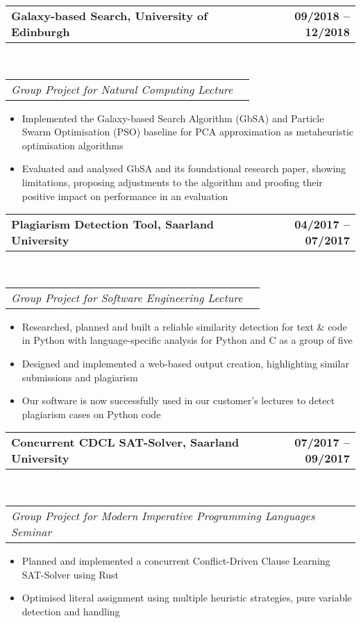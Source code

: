 \documentclass[10pt,letterpaper]{article}
\makeatletter
\newcommand{\headerrow}[2]
{\begin{tabular*}{\linewidth}{l@{\extracolsep{\fill}}r}
	#1 &
	#2 \\
\end{tabular*}}
\makeatother
\begin{document}
\vspace{0.4em}

\noindent
\headerrow{\textbf{Galaxy-based Search, University of Edinburgh}}{\textbf{09/2018 -- 12/2018}}
\\
\headerrow{\emph{Group Project for Natural Computing Lecture}}{}
\vspace{-1.6em}
\begin{itemize}
    \setlength\itemsep{0em}
    \item Implemented the Galaxy-based Search Algorithm (GbSA) and Particle Swarm Optimisation (PSO) baseline 
    for PCA approximation as metaheuristic optimisation algorithms
    \item Evaluated and analysed GbSA and its foundational research paper, showing limitations, proposing adjustments to 
    the algorithm and proofing their positive impact on performance in an evaluation
\end{itemize}

\vspace{0.4em}

\noindent
\headerrow{\textbf{Plagiarism Detection Tool, Saarland University}}{\textbf{04/2017 -- 07/2017}}
\\
\headerrow{\emph{Group Project for Software Engineering Lecture}}{}
\vspace{-1.6em}
\begin{itemize}
    \setlength\itemsep{0em}
    \item Researched, planned and built a reliable similarity detection for text \& code in Python with language-specific analysis for Python and C as a group of five
    \item Designed and implemented a web-based output creation, highlighting similar submissions and plagiarism
    \item Our software is now successfully used in our customer's lectures to detect plagiarism cases on Python code
\end{itemize}

\vspace{0.4em}

\noindent
\headerrow{\textbf{Concurrent CDCL SAT-Solver, Saarland University}}{\textbf{07/2017 -- 09/2017}}
\\
\headerrow{\emph{Group Project for Modern Imperative Programming Languages Seminar}}{}
\vspace{-1.6em}
\begin{itemize}
    \setlength\itemsep{0em}
    \item Planned and implemented a concurrent Conflict-Driven Clause Learning SAT-Solver using Rust
    \item Optimised literal assignment using multiple heuristic strategies, pure variable detection and handling
\end{itemize}
\end{document}
